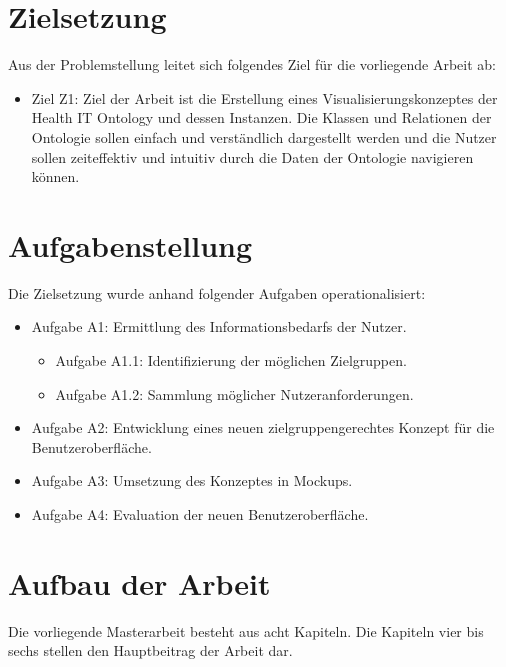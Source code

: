 \section{Zielsetzung}\label{sec:zielsetzung}

Aus der Problemstellung leitet sich folgendes Ziel für die vorliegende Arbeit ab:

\begin{itemize}
\item Ziel Z1: Ziel der Arbeit ist die Erstellung eines Visualisierungskonzeptes der Health IT Ontology und dessen Instanzen.
Die Klassen und Relationen der Ontologie sollen einfach und verständlich dargestellt werden und die Nutzer sollen zeiteffektiv und intuitiv durch die Daten der Ontologie navigieren können.
\end{itemize}

\section{Aufgabenstellung}\label{sec:aufgabenstellung}

Die Zielsetzung wurde anhand folgender Aufgaben operationalisiert:

\begin{itemize}
	\item Aufgabe A1: Ermittlung des Informationsbedarfs der Nutzer.
		\begin{itemize}
		\item Aufgabe A1.1: Identifizierung der möglichen Zielgruppen.
		\item Aufgabe A1.2: Sammlung möglicher Nutzeranforderungen.
		\end{itemize}
	\item Aufgabe A2: Entwicklung eines neuen zielgruppengerechtes Konzept für die Benutzeroberfläche.
	\item Aufgabe A3: Umsetzung des Konzeptes in Mockups.
	\item Aufgabe A4: Evaluation der neuen Benutzeroberfläche.
\end{itemize}

\section{Aufbau der Arbeit}\label{sec:aufbau}

Die vorliegende Masterarbeit besteht aus acht Kapiteln. Die Kapiteln vier bis sechs stellen den Hauptbeitrag der Arbeit dar. \newline

